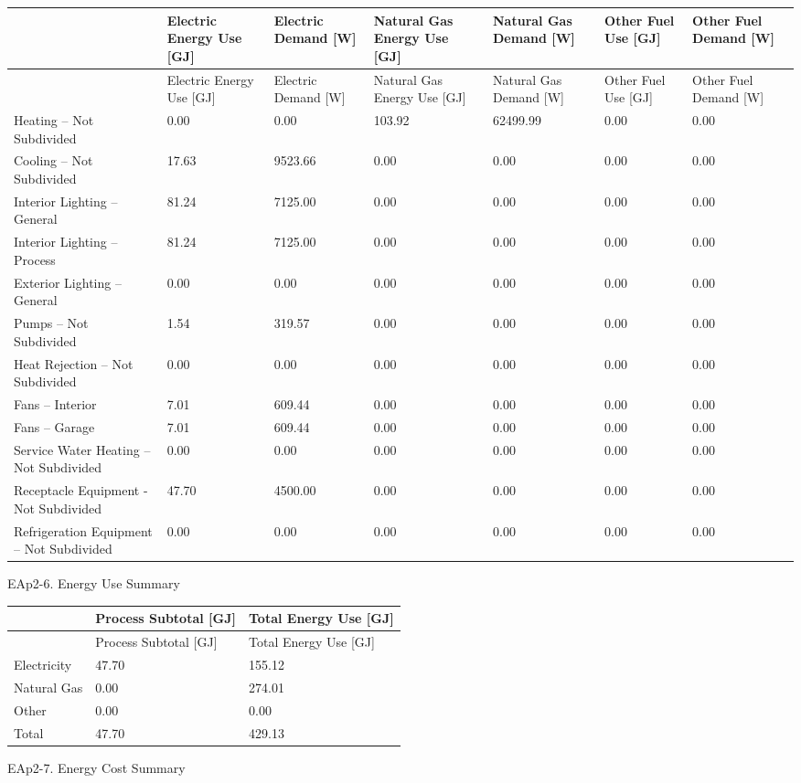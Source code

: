 \begin{longtable}[c]{>{\raggedright}p{0.85in}>{\raggedright}p{0.85in}>{\raggedright}p{0.85in}>{\raggedright}p{0.85in}>{\raggedright}p{0.85in}>{\raggedright}p{0.85in}>{\raggedright}p{0.85in}}
\toprule 
 & Electric Energy Use [GJ] & Electric Demand [W] & Natural Gas Energy Use [GJ] & Natural Gas Demand [W] & Other Fuel Use [GJ] & Other Fuel Demand [W] \tabularnewline
\midrule
\endfirsthead

\toprule 
 & Electric Energy Use [GJ] & Electric Demand [W] & Natural Gas Energy Use [GJ] & Natural Gas Demand [W] & Other Fuel Use [GJ] & Other Fuel Demand [W] \tabularnewline
\midrule
\endhead

Heating -- Not Subdivided  & 0.00 & 0.00 & 103.92 & 62499.99 & 0.00 & 0.00 \tabularnewline
Cooling -- Not Subdivided  & 17.63 & 9523.66 & 0.00 & 0.00 & 0.00 & 0.00 \tabularnewline
Interior Lighting -- General & 81.24 & 7125.00 & 0.00 & 0.00 & 0.00 & 0.00 \tabularnewline
Interior Lighting -- Process & 81.24 & 7125.00 & 0.00 & 0.00 & 0.00 & 0.00 \tabularnewline
Exterior Lighting -- General  & 0.00 & 0.00 & 0.00 & 0.00 & 0.00 & 0.00 \tabularnewline
Pumps -- Not Subdivided  & 1.54 & 319.57 & 0.00 & 0.00 & 0.00 & 0.00 \tabularnewline
Heat Rejection -- Not Subdivided  & 0.00 & 0.00 & 0.00 & 0.00 & 0.00 & 0.00 \tabularnewline
Fans -- Interior  & 7.01 & 609.44 & 0.00 & 0.00 & 0.00 & 0.00 \tabularnewline
Fans -- Garage  & 7.01 & 609.44 & 0.00 & 0.00 & 0.00 & 0.00 \tabularnewline
Service Water Heating  -- Not Subdivided & 0.00 & 0.00 & 0.00 & 0.00 & 0.00 & 0.00 \tabularnewline
Receptacle Equipment - Not Subdivided& 47.70 & 4500.00 & 0.00 & 0.00 & 0.00 & 0.00 \tabularnewline
Refrigeration Equipment -- Not Subdivided & 0.00 & 0.00 & 0.00 & 0.00 & 0.00 & 0.00 \tabularnewline
\bottomrule
\end{longtable}


EAp2-6. Energy Use Summary

\begin{longtable}[c]{@{}lll@{}}
\toprule 
 & Process Subtotal [GJ] & Total Energy Use [GJ] \tabularnewline
\midrule
\endfirsthead

\toprule 
 & Process Subtotal [GJ] & Total Energy Use [GJ] \tabularnewline
\midrule
\endhead

Electricity & 47.70 & 155.12 \tabularnewline
Natural Gas & 0.00 & 274.01 \tabularnewline
Other & 0.00 & 0.00 \tabularnewline
Total & 47.70 & 429.13 \tabularnewline
\bottomrule
\end{longtable}

EAp2-7. Energy Cost Summary

